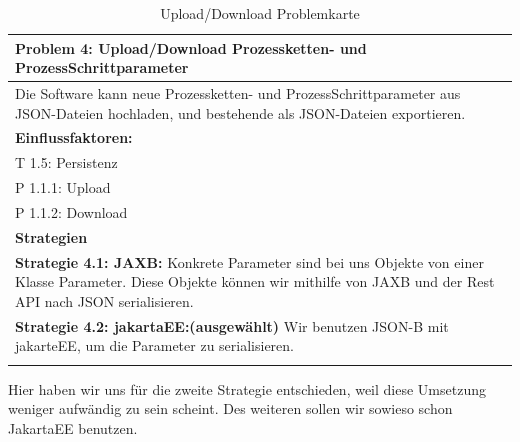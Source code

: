 \documentclass[enabledeprecatedfontcommands,fontsize=12pt,paper=a4,twoside]{scrartcl}
\begin{document}
\begin{table}[H]
    \centering
    \begin{tabular}{|p{15cm}|}
    \hline
          \textbf{Problem 4:} Upload/Download Prozessketten- und ProzessSchrittparameter \\ \hline
          Die Software kann neue Prozessketten- und ProzessSchrittparameter aus JSON-Dateien hochladen, und bestehende als JSON-Dateien exportieren.
          \\ \hline
          \textbf{Einflussfaktoren: } \\
          T 1.5: Persistenz \\
          P 1.1.1: Upload\\
          P 1.1.2: Download\\
          \hline
          \textbf{Strategien} \\ \hline
            {}          
           \label{strategie:4.1}     
          \textbf{Strategie 4.1: JAXB:}  Konkrete Parameter sind bei uns Objekte von einer Klasse Parameter. Diese Objekte können wir mithilfe von JAXB und der Rest API nach JSON serialisieren. \\ 
            {}          
           \label{strategie:4.2}     
          \textbf{Strategie 4.2: jakartaEE:(ausgewählt)} Wir benutzen JSON-B mit jakarteEE, um die Parameter zu serialisieren. \\
          \\ \hline
    \end{tabular}
    \caption{Upload/Download Problemkarte}
    \label{tab:ProblemKarte4}
\end{table}
Hier haben wir uns für die zweite Strategie entschieden, weil diese Umsetzung weniger aufwändig zu sein scheint. Des weiteren sollen wir sowieso schon JakartaEE benutzen. \\
\end{document}
